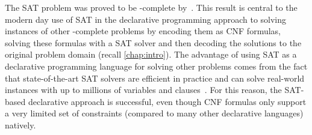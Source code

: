 The SAT problem was proved to be \NP-complete by~\textcite{DBLP:conf/stoc/Cook71}.
This result is central to the modern day use of SAT in the declarative programming approach to solving instances of other \NP-complete problems by encoding them as CNF formulas, solving these formulas with a SAT solver and then decoding the solutions to the original problem domain (recall \cref{chap:intro}).
The advantage of using SAT as a declarative programming language for solving other problems comes from the fact that state-of-the-art SAT solvers are efficient in practice and can solve real-world instances with up to millions of variables and clauses~\autocite{handbook2-cdcl}.
For this reason, the SAT-based declarative approach is successful, even though CNF formulas only support a very limited set of constraints (compared to many other declarative languages) natively.


